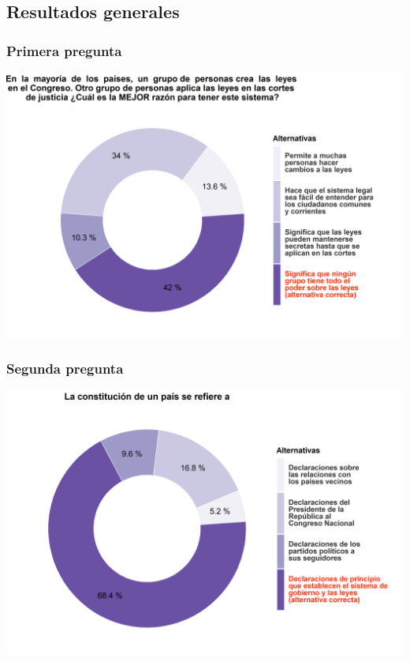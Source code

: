 \documentclass[
  14pt,
]{book}
\begin{document}
\hypertarget{resultados-generales}{%
\subsection{Resultados generales}\label{resultados-generales}}

\hypertarget{primera-pregunta}{%
\subsubsection{Primera pregunta}\label{primera-pregunta}}

\begin{center}\includegraphics[width=52.49in]{images/ccivico_1} \end{center}

\hypertarget{segunda-pregunta}{%
\subsubsection{Segunda pregunta}\label{segunda-pregunta}}

\begin{center}\includegraphics[width=52.49in]{images/ccivico_2} \end{center}
\end{document}
